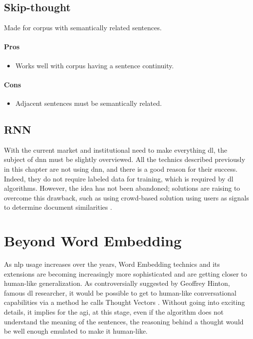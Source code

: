 \subsection{Skip-thought\cite{article:skip-thought}}
Made for corpus with semantically related sentences.
\paragraph{Pros}
\begin{itemize}
    \setlength\itemsep{0em}
    \item Works well with corpus having a sentence continuity.
\end{itemize}
\paragraph{Cons}
\begin{itemize}
    \setlength\itemsep{0em}
    \item Adjacent sentences must be semantically related.
\end{itemize}

\subsection{RNN}
\label{sota:rnn}
With the current market and institutional need to make everything \gls{dl}, the subject of \gls{dnn} must be slightly overviewed. All the technics described previously in this chapter are not using \gls{dnn}, and there is a good reason for their success. Indeed, they do not require labeled data for training, which is required by \gls{dl} algorithms. However, the idea has not been abandoned; solutions are raising to overcome this drawback, such as using crowd-based solution using users as signals to determine document similarities \cite{article:lstm-deep-sentence-embedding}.



\section{Beyond Word Embedding}
As \gls{nlp} usage increases over the years, Word Embedding technics and its extensions are becoming increasingly more sophisticated and are getting closer to human-like generalization. As controversially suggested by Geoffrey Hinton, famous \gls{dl} researcher, it would be possible to get to human-like conversational capabilities via a method he calls Thought Vectors \cite{article:thought2vec-geoffrey-hinton}. Without going into exciting details, it implies for the \gls{agi}, at this stage, even if the algorithm does not understand the meaning of the sentences, the reasoning behind a thought would be well enough emulated to make it human-like.


